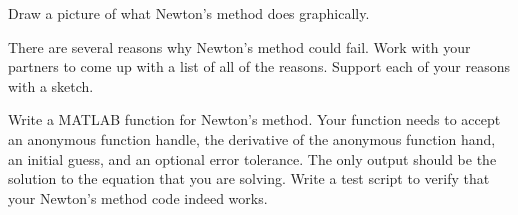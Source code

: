 \begin{problem}
    Draw a picture of what Newton's method does graphically.
\end{problem}

\begin{problem}
    There are several reasons why Newton's method could fail.  Work with your partners to
    come up with a list of all of the reasons.  Support each of your reasons with a
    sketch.
\end{problem}

\begin{problem}
    Write a MATLAB function for Newton's method.  Your function needs to accept an
    anonymous function handle, the derivative of the anonymous function hand, an initial
    guess, and an optional error
    tolerance. The only output should be the solution to the equation that you are
    solving.  Write a test script to verify that your Newton's method code indeed works.
    \\
\end{problem}


